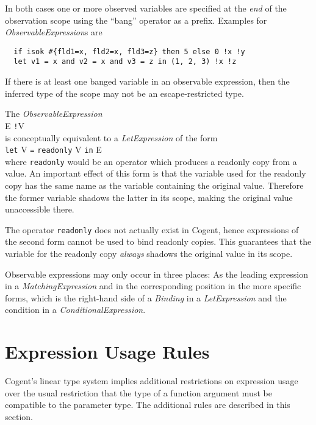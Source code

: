 \documentclass[a4paper]{report}
\newcommand{\code}[1]{\textnormal{\texttt{#1}}}
\newcommand{\cogent}{Cogent\xspace}
\begin{document}
In both cases one or more observed variables are specified at the \textit{end} of the observation scope
using the ``bang'' operator as a prefix. Examples for \textit{ObservableExpression}s are
\begin{verbatim}
  if isok #{fld1=x, fld2=x, fld3=z} then 5 else 0 !x !y
  let v1 = x and v2 = x and v3 = z in (1, 2, 3) !x !z
\end{verbatim}

If there is at least one banged variable in an observable expression, then the inferred type of the scope
may not be an escape-restricted type. 

The \textit{ObservableExpression}\\
\hspace*{1cm} E \code{!}V\\
is conceptually equivalent to a \textit{LetExpression} of the form\\
\hspace*{1cm} \code{let} V \code{=} \code{readonly} V \code{in} E\\
where \code{readonly} would be an operator which produces a readonly copy from a value. An important effect of
this form is that the variable used for the readonly copy has the same name as the variable containing the original
value. Therefore the former variable shadows the latter in its scope, making the original value unaccessible there.

The operator \code{readonly} does not actually exist in \cogent, hence expressions of the second form cannot be used
to bind readonly copies. This guarantees that the variable for the readonly copy \textit{always} shadows the
original value in its scope.

Observable expressions may only occur in three places: As the leading expression in a \textit{MatchingExpression} and 
in the corresponding position in the more specific forms, which is the right-hand side of a \textit{Binding} in a 
\textit{LetExpression} and the condition in a \textit{ConditionalExpression}. 

\section{Expression Usage Rules}
\label{expr-usage}

\cogent's linear type system implies additional restrictions on expression usage over the usual restriction that
the type of a function argument must be compatible to the parameter type. The additional rules are described in 
this section.
\end{document}
